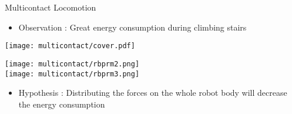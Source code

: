 
\begin{frame}{Multicontact Locomotion}
\vspace*{-0.5cm}
\begin{itemize}
 \item Observation : Great energy consumption during climbing stairs
\end{itemize}

\begin{center}
  \texttt{[image: multicontact/cover.pdf]}
  \hspace*{0.5cm}
  \begin{minipage}{0.3\linewidth}
    \vspace*{-4.8cm}
    \texttt{[image: multicontact/rbprm2.png]}\\
    \texttt{[image: multicontact/rbprm3.png]}  
  \end{minipage}
\end{center}


\begin{itemize}
 \item Hypothesis : Distributing the forces on the whole robot body will decrease the energy consumption
\end{itemize}

\end{frame}



